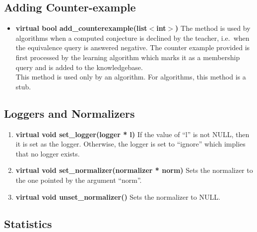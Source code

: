 \subsection*{Adding Counter-example}

\begin{itemize}
 \item \textbf{virtual bool add\_counterexample(list$<$int$>$)} \vskip 1pt
	The method is used by \online algorithms when a computed conjecture is declined by the teacher, i.e.\ when the equivalence query is answered negative. The counter example provided is first processed by the learning algorithm which marks it as a membership query and is added to the knowledgebase. \\
	This method is used only by an \online algorithm. For \offline algorithms, this method is a stub.
\end{itemize}

\subsection*{Loggers and Normalizers}

\begin{enumerate}
 \item \textbf{virtual void set\_logger(logger * l)} \vskip 1pt
	If the value of ``l'' is not NULL, then it is set as the logger. Otherwise, the logger is set to ``ignore'' which implies that no logger exists.

 \item \textbf{virtual void set\_normalizer(normalizer * norm)} \vskip 1pt
	Sets the normalizer to the one pointed by the argument ``norm''.

 \item \textbf{virtual void unset\_normalizer()} \vskip 1pt
	Sets the normalizer to NULL. 
\end{enumerate}

\subsection*{Statistics}


